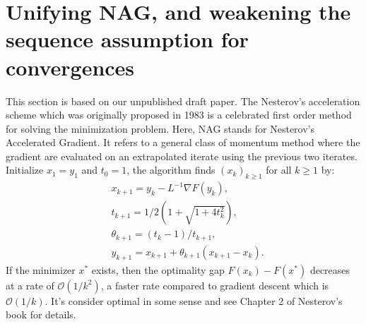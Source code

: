 \documentclass[12pt]{article}
\begin{document}
\section{Unifying NAG, and weakening the sequence assumption for convergences}\label{sec:unify-nes-acceleration}
    This section is based on our unpublished draft paper. 
    The Nesterov's acceleration scheme which was originally proposed in 1983 \cite{nesterov_method_1983} is a celebrated first order method for solving the minimization problem. 
    Here, NAG stands for Nesterov's Accelerated Gradient. 
    It refers to a general class of momentum method where the gradient are evaluated on an extrapolated iterate using the previous two iterates. 
    Initialize $x_1 = y_1$ and $t_0 = 1$, the algorithm finds $(x_k)_{k \ge 1}$ for all $k \ge 1$ by: 
    \begin{align}
        & x_{k + 1} = y_k - L^{-1}\nabla F(y_k), 
        \\
        & t_{k + 1} = 1/2\left(1 + \sqrt{1 + 4t_{k}^2}\right), 
        \\
        & \theta_{k + 1} = (t_{k} - 1)/t_{k + 1}, 
        \\
        & y_{k + 1} = x_{k + 1} + \theta_{k + 1}(x_{k + 1} - x_k). 
    \end{align}\label{eqn:example-algorithm}
    If the minimizer $x^*$ exists, then the optimality gap $F(x_k) - F(x^*)$ decreases at a rate of $\mathcal O(1/k^2)$, a faster rate compared to gradient descent which is $\mathcal O(1/k)$. 
    It's consider optimal in some sense and see Chapter 2 of Nesterov's book \cite{nesterov_lectures_2018} for details. 
\end{document}

